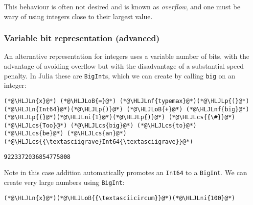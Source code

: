 \documentclass[12pt,a4paper]{article}
\newcommand{\HLJLn}[1]{#1}
\newcommand{\HLJLnf}[1]{\textcolor[RGB]{66,102,213}{#1}}
\newcommand{\HLJLni}[1]{\textcolor[RGB]{59,151,46}{#1}}
\newcommand{\HLJLoB}[1]{\textcolor[RGB]{102,102,102}{\textbf{#1}}}
\newcommand{\HLJLp}[1]{#1}
\newcommand{\HLJLcs}[1]{\textcolor[RGB]{153,153,119}{\textit{#1}}}
\begin{document}
This behaviour is often not desired and is known as \emph{overflow}, and one must be wary of using integers close to their largest value.

\subsubsection{Variable bit representation (\textbf{advanced})}
An alternative representation for integers uses a variable number of bits, with the advantage of avoiding overflow but with the disadvantage of a substantial speed penalty. In Julia these are \texttt{BigInt}s, which we can create by calling \texttt{big} on an integer:


\begin{lstlisting}
(*@\HLJLn{x}@*) (*@\HLJLoB{=}@*) (*@\HLJLnf{typemax}@*)(*@\HLJLp{(}@*)(*@\HLJLn{Int64}@*)(*@\HLJLp{)}@*) (*@\HLJLoB{+}@*) (*@\HLJLnf{big}@*)(*@\HLJLp{(}@*)(*@\HLJLni{1}@*)(*@\HLJLp{)}@*) (*@\HLJLcs{{\#}}@*) (*@\HLJLcs{Too}@*) (*@\HLJLcs{big}@*) (*@\HLJLcs{to}@*) (*@\HLJLcs{be}@*) (*@\HLJLcs{an}@*) (*@\HLJLcs{{\textasciigrave}Int64{\textasciigrave}}@*)
\end{lstlisting}

\begin{lstlisting}
9223372036854775808
\end{lstlisting}


Note in this case addition automatically promotes an \texttt{Int64} to a \texttt{BigInt}. We can create very large numbers using \texttt{BigInt}:


\begin{lstlisting}
(*@\HLJLn{x}@*)(*@\HLJLoB{{\textasciicircum}}@*)(*@\HLJLni{100}@*)
\end{lstlisting}
\end{document}
